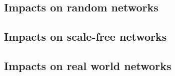 \documentclass[
]{article}
\begin{document}
\hypertarget{impacts-on-random-networks}{%
\subsection{Impacts on random
networks}\label{impacts-on-random-networks}}

\hypertarget{impacts-on-scale-free-networks}{%
\subsection{Impacts on scale-free
networks}\label{impacts-on-scale-free-networks}}

\hypertarget{impacts-on-real-world-networks}{%
\subsection{Impacts on real world
networks}\label{impacts-on-real-world-networks}}
\end{document}
